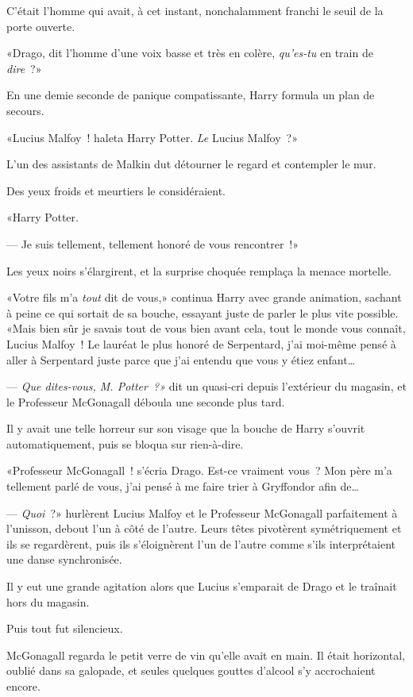 C'était l'homme qui avait, à cet instant, nonchalamment franchi le seuil de la porte ouverte.

«Drago, dit l'homme d'une voix basse et très en colère, \emph{qu'es-tu} en train de \emph{dire}~?»

En une demie seconde de panique compatissante, Harry formula un plan de secours.

«Lucius Malfoy~! haleta Harry Potter. \emph{Le} Lucius Malfoy~?»

L'un des assistants de Malkin dut détourner le regard et contempler le mur.

Des yeux froids et meurtiers le considéraient.

«Harry Potter.

--- Je suis tellement, tellement honoré de vous rencontrer~!»

Les yeux noirs s'élargirent, et la surprise choquée remplaça la menace mortelle.

«Votre fils m'a \emph{tout} dit de vous,» continua Harry avec grande animation, sachant à peine ce qui sortait de sa bouche, essayant juste de parler le plus vite possible. «Mais bien sûr je savais tout de vous bien avant cela, tout le monde vous connaît, Lucius Malfoy~! Le lauréat le plus honoré de Serpentard, j'ai moi-même pensé à aller à Serpentard juste parce que j'ai entendu que vous y étiez enfant…

--- \emph{Que dites-vous, M. Potter~?»} dit un quasi-cri depuis l'extérieur du magasin, et le Professeur McGonagall déboula une seconde plus tard.

Il y avait une telle horreur sur son visage que la bouche de Harry s'ouvrit automatiquement, puis se bloqua sur rien-à-dire.

«Professeur McGonagall~! s'écria Drago. Est-ce vraiment vous~? Mon père m'a tellement parlé de vous, j'ai pensé à me faire trier à Gryffondor afin de…

--- \emph{Quoi}~?» hurlèrent Lucius Malfoy et le Professeur McGonagall parfaitement à l'unisson, debout l'un à côté de l'autre. Leurs têtes pivotèrent symétriquement et ils se regardèrent, puis ils s'éloignèrent l'un de l'autre comme s'ils interprétaient une danse synchronisée.

Il y eut une grande agitation alors que Lucius s'emparait de Drago et le traînait hors du magasin.

Puis tout fut silencieux.

McGonagall regarda le petit verre de vin qu'elle avait en main. Il était horizontal, oublié dans sa galopade, et seules quelques gouttes d'alcool s'y accrochaient encore.

